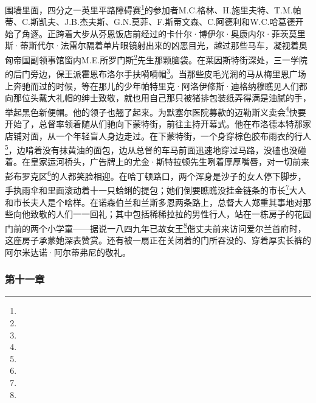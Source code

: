 \par 围墙里面，四分之一英里平路障碍赛\footnote{}的参加者M.C.格林、H.施里夫特、T.M.帕蒂、C.斯凯夫、J.B.杰夫斯、G.N.莫菲、F.斯蒂文森、C.阿德利和W.C.哈葛德开始了角逐。正跨着大步从芬恩饭店前经过的卡什尔·博伊尔·奥康内尔·菲茨莫里斯·蒂斯代尔·法雷尔隔着单片眼镜射出来的凶恶目光，越过那些马车，凝视着奥匈帝国副领事馆窗内M.E.所罗门斯\footnote{}先生那颗脑袋。在莱因斯特街深处，三一学院的后门旁边，保王派霍恩布洛尔手扶嗬嗬帽\footnote{}。当那些皮毛光润的马从梅里恩广场上奔驰而过的时候，等在那儿的少年帕特里克·阿洛伊修斯·迪格纳穆瞧见人们都向那位头戴大礼帽的绅士致敬，就也用自己那只被猪排包装纸弄得满是油腻的手，举起黑色新便帽。他的领子也翘了起来。为默塞尔医院募款的迈勒斯义卖会\footnote{}快要开始了，总督率领着随从们驰向下蒙特街，前往主持开幕式。他在布洛德本特那家店铺对面，从一个年轻盲人身边走过。在下蒙特街，一个身穿棕色胶布雨衣的行人\footnote{}，边啃着没有抹黄油的面包，边从总督的车马前面迅速地穿过马路，没磕也没碰着。在皇家运河桥头，广告牌上的尤金·斯特拉顿先生咧着厚厚嘴唇，对一切前来彭布罗克区\footnote{}的人都笑脸相迎。在哈丁顿路口，两个浑身是沙子的女人停下脚步，手执雨伞和里面滚动着十一只蛤蜊的提包；她们倒要瞧瞧没挂金链条的市长\footnote{}大人和市长夫人是个啥样。在诺森伯兰和兰斯多恩两条路上，总督大人郑重其事地对那些向他致敬的人们一一回礼；其中包括稀稀拉拉的男性行人，站在一栋房子的花园门前的两个小学童——据说一八四九年已故女王\footnote{}偕丈夫前来访问爱尔兰首府时，这座房子承蒙她深表赞赏。还有被一扇正在关闭着的门所吞没的、穿着厚实长裤的阿尔米达诺·阿尔蒂弗尼的敬礼。





\subsubsection*{第十一章}

